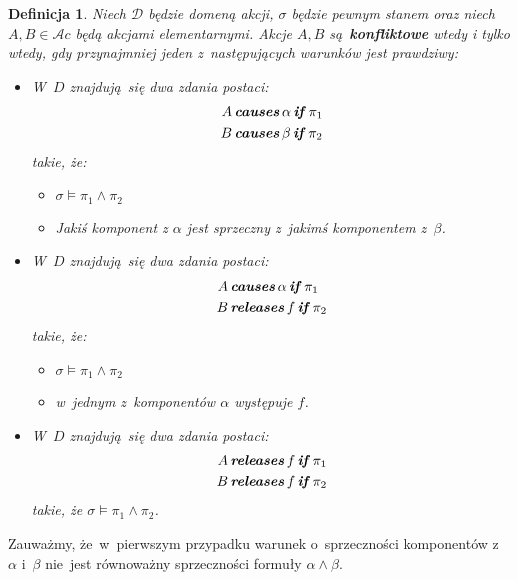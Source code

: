 \documentclass[11pt,a4paper]{article}
\newtheorem{defn}{Definicja}
\DeclareMathOperator{\Causes}{\textbf{\textit{causes}}}
\DeclareMathOperator{\If}{\textbf{\textit{if}}}
\DeclareMathOperator{\Releases}{\textbf{\textit{releases}}}
\begin{document}
\begin{defn}
    \label{defn:conflict}
    Niech $\mathcal{D}$ będzie domeną akcji, $\sigma$ będzie pewnym stanem oraz niech $A, B \in \mathcal{A}c$ będą akcjami elementarnymi. Akcje $A, B$ są~\textbf{konfliktowe} wtedy i tylko wtedy, gdy przynajmniej jeden z~następujących warunków jest prawdziwy:
    \begin{itemize}
        \item W~$D$ znajdują~się dwa zdania postaci:
        \begin{align*}
            A & \Causes \alpha \If \pi_1 \\
            B & \Causes \beta \If \pi_2
        \end{align*}
        takie, że:
        \begin{itemize}
            \item $\sigma \models \pi_1 \land \pi_2$
            \item Jakiś komponent z $\alpha$ jest sprzeczny z~jakimś komponentem z~$\beta$.
        \end{itemize}
        \item W~$D$ znajdują~się dwa zdania postaci:
        \begin{align*}
            A & \Causes \alpha \If \pi_1 \\
            B & \Releases f \If \pi_2
        \end{align*}
        takie, że:
        \begin{itemize}
            \item $\sigma \models \pi_1 \land \pi_2$
            \item w~jednym z~komponentów $\alpha$ występuje $f$.
        \end{itemize}
        \item W~$D$ znajdują~się dwa zdania postaci:
        \begin{align*}
            A & \Releases f \If \pi_1 \\
            B & \Releases f \If \pi_2
        \end{align*}
        takie, że $\sigma \models \pi_1 \land \pi_2$.
    \end{itemize}
\end{defn}

Zauważmy, że~w~pierwszym przypadku warunek o~sprzeczności komponentów z~$\alpha$ i~$\beta$ nie~jest równoważny sprzeczności formuły $\alpha \land \beta$.
\end{document}
